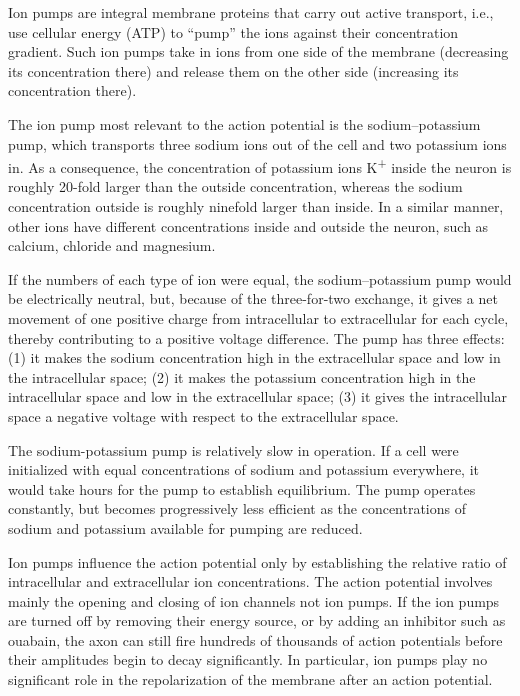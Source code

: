 Ion pumps are integral membrane proteins that carry out active transport, i.e., use cellular energy (ATP) to ``pump'' the ions against their concentration gradient. Such ion pumps take in ions from one side of the membrane (decreasing its concentration there) and release them on the other side (increasing its concentration there).

The ion pump most relevant to the action potential is the sodium--potassium pump, which transports three sodium ions out of the cell and two potassium ions in. As a consequence, the concentration of potassium ions K\textsuperscript{+} inside the neuron is roughly 20-fold larger than the outside concentration, whereas the sodium concentration outside is roughly ninefold larger than inside. In a similar manner, other ions have different concentrations inside and outside the neuron, such as calcium, chloride and magnesium.

If the numbers of each type of ion were equal, the sodium--potassium pump would be electrically neutral, but, because of the three-for-two exchange, it gives a net movement of one positive charge from intracellular to extracellular for each cycle, thereby contributing to a positive voltage difference. The pump has three effects: (1) it makes the sodium concentration high in the extracellular space and low in the intracellular space; (2) it makes the potassium concentration high in the intracellular space and low in the extracellular space; (3) it gives the intracellular space a negative voltage with respect to the extracellular space.

The sodium-potassium pump is relatively slow in operation. If a cell were initialized with equal concentrations of sodium and potassium everywhere, it would take hours for the pump to establish equilibrium. The pump operates constantly, but becomes progressively less efficient as the concentrations of sodium and potassium available for pumping are reduced.

Ion pumps influence the action potential only by establishing the relative ratio of intracellular and extracellular ion concentrations. The action potential involves mainly the opening and closing of ion channels not ion pumps. If the ion pumps are turned off by removing their energy source, or by adding an inhibitor such as ouabain, the axon can still fire hundreds of thousands of action potentials before their amplitudes begin to decay significantly. In particular, ion pumps play no significant role in the repolarization of the membrane after an action potential.

